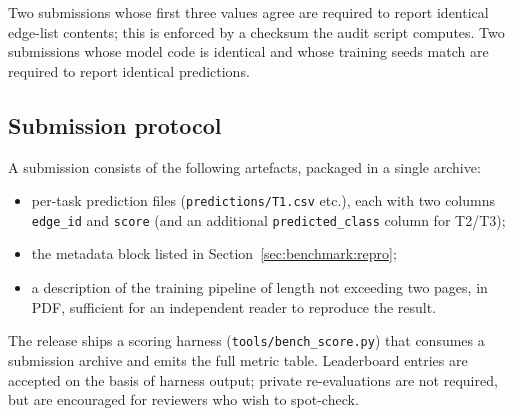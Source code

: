 Two submissions whose first three values agree are required to
report identical edge-list contents; this is enforced by a
checksum the audit script computes.  Two submissions whose model
code is identical and whose training seeds match are required to
report identical predictions.

\subsection{Submission protocol}
\label{sec:benchmark:submission}

A submission consists of the following artefacts, packaged in a
single archive:

\begin{itemize}
  \item per-task prediction files
    (\texttt{predictions/T1.csv} etc.), each with two columns
    \texttt{edge\_id} and \texttt{score} (and an additional
    \texttt{predicted\_class} column for T2/T3);
  \item the metadata block listed in
    Section~\ref{sec:benchmark:repro};
  \item a description of the training pipeline of length not
    exceeding two pages, in PDF, sufficient for an independent
    reader to reproduce the result.
\end{itemize}

The release ships a scoring harness
(\texttt{tools/bench\_score.py}) that consumes a submission archive
and emits the full metric table.  Leaderboard entries are accepted
on the basis of harness output; private re-evaluations are not
required, but are encouraged for reviewers who wish to spot-check.
